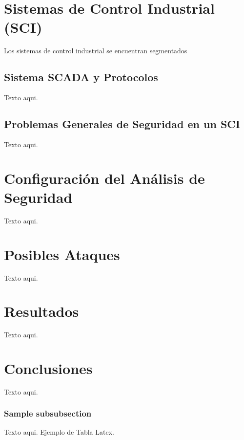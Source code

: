 \documentclass[jou,apacite]{apa6}
\begin{document}
\section{Sistemas de Control Industrial (SCI)}
Los sistemas de control industrial se encuentran segmentados
\subsection{Sistema SCADA y Protocolos }
Texto aqui.

\subsection{Problemas Generales de Seguridad en un SCI }
Texto aqui.

\section{Configuración del Análisis de Seguridad}
Texto aqui.
\section{Posibles Ataques }
Texto aqui.
\section{Resultados }
Texto aqui.
\section{Conclusiones }
Texto aqui.

\subsubsection{Sample subsubsection}
Texto aqui.
Ejemplo de Tabla Latex.


\end{document}
